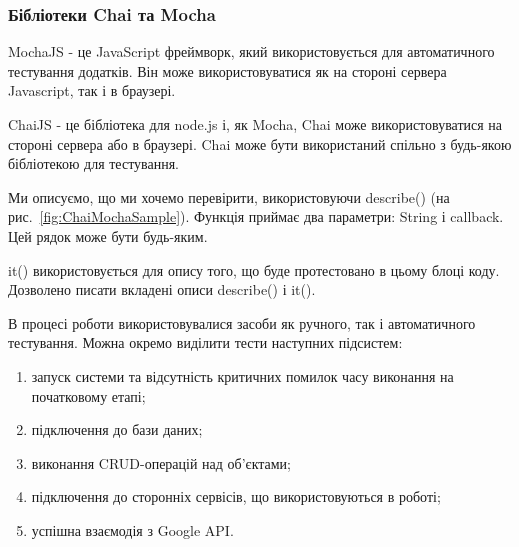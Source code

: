 \subsubsection{Бібліотеки Chai та Mocha}


MochaJS - це JavaScript фреймворк, який використовується для автоматичного тестування додатків. Він може використовуватися як на стороні сервера Javascript, так і в браузері. 

ChaiJS - це бібліотека для node.js і, як Mocha, Chai може використовуватися на стороні сервера або в браузері. Chai може бути використаний спільно з будь-якою бібліотекою для тестування.

Ми описуємо, що ми хочемо перевірити, використовуючи describe() (на рис.~\ref{fig:ChaiMochaSample}). Функція приймає два параметри: String і callback. Цей рядок може бути будь-яким.

it() використовується для опису того, що буде протестовано в цьому блоці коду. Дозволено писати вкладені описи describe() і it().

В процесі роботи використовувалися засоби як ручного, так і автоматичного тестування. 
Можна окремо виділити тести наступних підсистем:

\begin{enumerate}
    \item запуск системи та відсутність  критичних помилок часу виконання на початковому етапі;
    \item підключення до бази даних;
    \item виконання CRUD-операцій над об'єктами;
    \item підключення до сторонніх сервісів, що використовуються в роботі;
    \item успішна взаємодія з Google API.
\end{enumerate}

